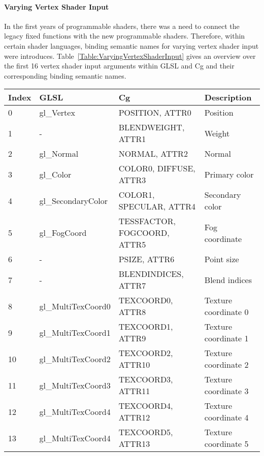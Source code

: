 \paragraph{Varying Vertex Shader Input}
In the first years of programmable shaders, there was a need to connect the legacy fixed functions with the new programmable shaders. Therefore, within certain shader languages, binding semantic names for varying vertex shader input were introduces. Table~\ref{Table:VaryingVertexShaderInput} gives an overview over the first 16 vertex shader input arguments within \ac{GLSL} and Cg and their corresponding binding semantic names.
\begin{table}[htb]
	\centering
	\begin{ThreePartTable}
		\begin{tabular}{|l|l|p{}|l|}
			\toprule
				\textbf{Index} & \textbf{\ac{GLSL}\tnote{1}} & \textbf{Cg\tnote{2}} & \textbf{Description}\\
			\midrule
				\hline
				0	&	gl\_Vertex			&	POSITION, ATTR0				&	Position\\
				\hline
				1	&	-					&	BLENDWEIGHT, ATTR1			&	Weight\\
				\hline
				2	&	gl\_Normal			&	NORMAL, ATTR2				&	Normal\\
				\hline
				3	&	gl\_Color			&	COLOR0, DIFFUSE, ATTR3		&	Primary color\\
				\hline
				4	&	gl\_SecondaryColor	&	COLOR1, SPECULAR, ATTR4		&	Secondary color\\
				\hline
				5	&	gl\_FogCoord		&	TESSFACTOR, FOGCOORD, ATTR5	&	Fog coordinate\\
				\hline
				6	&	-					&	PSIZE, ATTR6				&	Point size\\
				\hline
				7	&	-					&	BLENDINDICES, ATTR7			&	Blend indices\\
				\hline
				8	&	gl\_MultiTexCoord0	&	TEXCOORD0, ATTR8			&	Texture coordinate 0\\
				\hline
				9	&	gl\_MultiTexCoord1	&	TEXCOORD1, ATTR9			&	Texture coordinate 1\\
				\hline
				10	&	gl\_MultiTexCoord2	&	TEXCOORD2, ATTR10			&	Texture coordinate 2\\
				\hline
				11	&	gl\_MultiTexCoord3	&	TEXCOORD3, ATTR11			&	Texture coordinate 3\\
				\hline
				12	&	gl\_MultiTexCoord4	&	TEXCOORD4, ATTR12			&	Texture coordinate 4\\
				\hline
				13	&	gl\_MultiTexCoord4	&	TEXCOORD5, ATTR13			&	Texture coordinate 5\\

\end{tabular}
\end{ThreePartTable}
\end{table}
